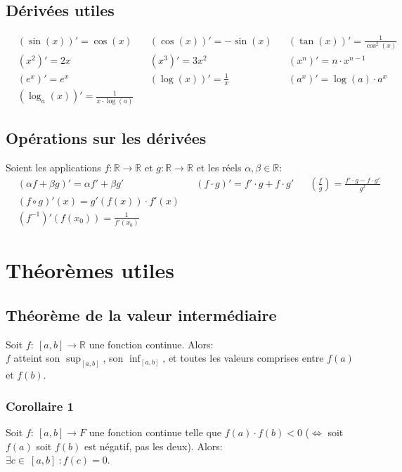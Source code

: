 \documentclass{article}
\begin{document}
\subsection{Dérivées utiles}
\begin{align*}
	&(\sin(x))' = \cos(x)
		& &(\cos(x))' = -\sin(x)
			& &(\tan(x))' = \frac{1}{\cos^2(x)} \\
	&(x^2)' = 2x
		& &(x^3)' = 3x^2
			& &(x^n)' = n \cdot x^{n-1} \\
	&(e^x)' = e^x
		& &(\log(x))' = \frac{1}{x}
			& &(a^x)' = \log(a) \cdot a^x \\
	&(\log_a(x))' = \frac{1}{x \cdot \log(a)}
\end{align*}

\subsection{Opérations sur les dérivées}
Soient les applications \(f: \mathbb{R} \to \mathbb{R}\) et \(g: \mathbb{R} \to \mathbb{R}\) et les réels \(\alpha, \beta \in \mathbb{R}\):
\begin{align*}
	&(\alpha f + \beta g)' = \alpha f' + \beta g' 
		& &(f \cdot g)' = f' \cdot g + f \cdot g' 
			& &\left (\frac{f}{g}\right ) = \frac{f' \cdot g - f \cdot g'}{g^2} \\ 
	&(f \circ g)'(x) = g'(f(x)) \cdot f'(x) \\
	&(f^{-1})' (f(x_0))  = \frac{1}{f'(x_0)} %
\end{align*}


\section{Théorèmes utiles}

\subsection{Théorème de la valeur intermédiaire}
Soit \(f : \ [a, b] \to \mathbb{R}\) une fonction continue. Alors: \\
\(f\) atteint son \(\sup_{[a, b]}\), son \(\inf_{[a, b]}\), et toutes les valeurs comprises entre \(f(a)\) et \(f(b)\).

\subsubsection{Corollaire 1}
Soit \(f : \ [a, b] \to F\) une fonction continue telle que \(f(a) \cdot f(b) < 0\) (\(\Leftrightarrow\) soit \(f(a)\) soit \(f(b)\) est négatif, pas les deux). Alors: \\
\(\exists c \in \ [a, b] \ : f(c) = 0\).
\end{document}
